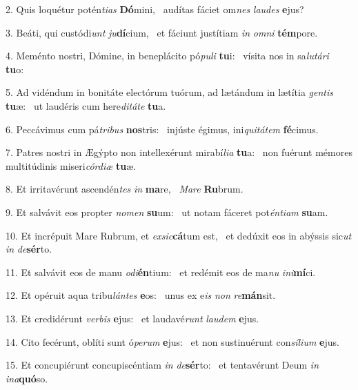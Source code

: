 2. Quis loquétur potén\textit{ti}\textit{as} \textbf{Dó}mini, \ast\  audítas fáciet om\textit{nes} \textit{lau}\textit{des} \textbf{e}jus?\

3. Beáti, qui custódi\textit{unt} \textit{ju}\textbf{dí}cium, \ast\  et fáciunt justítiam \textit{in} \textit{om}\textit{ni} \textbf{tém}pore.\

4. Meménto nostri, Dómine, in beneplácito pó\textit{pu}\textit{li} \textbf{tu}i: \ast\  vísita nos in sa\textit{lu}\textit{tá}\textit{ri} \textbf{tu}o:\

5. Ad vidéndum in bonitáte electórum tuórum, ad lætándum in lætítia \textit{gen}\textit{tis} \textbf{tu}æ: \ast\  ut laudéris cum here\textit{di}\textit{tá}\textit{te} \textbf{tu}a.\

6. Peccávimus cum pá\textit{tri}\textit{bus} \textbf{nos}tris: \ast\  injúste égimus, ini\textit{qui}\textit{tá}\textit{tem} \textbf{fé}cimus.\

7. Patres nostri in Ægýpto non intellexérunt mirabí\textit{li}\textit{a} \textbf{tu}a: \ast\  non fuérunt mémores multitúdinis miseri\textit{cór}\textit{di}\textit{æ} \textbf{tu}æ.\

8. Et irritavérunt ascendén\textit{tes} \textit{in} \textbf{ma}re, \ast\  \textit{Ma}\textit{re} \textbf{Ru}brum.\

9. Et salvávit eos propter \textit{no}\textit{men} \textbf{su}um: \ast\  ut notam fáceret pot\textit{én}\textit{ti}\textit{am} \textbf{su}am.\

10. Et incrépuit Mare Rubrum, et \textit{ex}\textit{sic}\textbf{cá}tum est, \ast\  et dedúxit eos in abýssis sic\textit{ut} \textit{in} \textit{de}\textbf{sér}to.\

11. Et salvávit eos de manu \textit{o}\textit{di}\textbf{én}tium: \ast\  et redémit eos de ma\textit{nu} \textit{in}\textit{i}\textbf{mí}ci.\

12. Et opéruit aqua tribu\textit{lán}\textit{tes} \textbf{e}os: \ast\  unus ex e\textit{is} \textit{non} \textit{re}\textbf{mán}sit.\

13. Et credidérunt \textit{ver}\textit{bis} \textbf{e}jus: \ast\  et laudavé\textit{runt} \textit{lau}\textit{dem} \textbf{e}jus.\

14. Cito fecérunt, oblíti sunt ó\textit{pe}\textit{rum} \textbf{e}jus: \ast\  et non sustinuérunt con\textit{sí}\textit{li}\textit{um} \textbf{e}jus.\

15. Et concupiérunt concupiscéntiam \textit{in} \textit{de}\textbf{sér}to: \ast\  et tentavérunt Deum \textit{in} \textit{in}\textit{a}\textbf{quó}so.\

